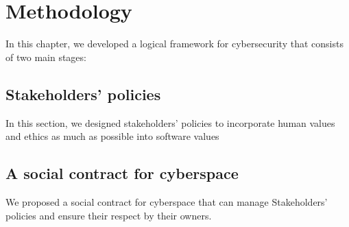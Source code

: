 \chapter{Methodology}
In this chapter, we  developed a logical framework for cybersecurity that consists of two main stages:
\section{Stakeholders' policies}
In this section, we designed stakeholders' policies to incorporate human values and ethics as much as possible into software values 
\section{A social contract for cyberspace}
We proposed a social contract for cyberspace that can manage Stakeholders' policies and ensure their respect by their owners.


